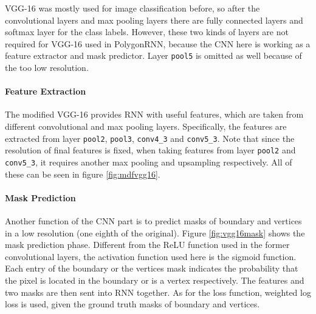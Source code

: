 

VGG-16 was mostly used for image classification before, so after the convolutional layers and max pooling layers there are fully connected layers and softmax layer for the class labels. However, these two kinds of layers are not required for VGG-16 used in PolygonRNN, because the CNN here is working as a feature extractor and mask predictor. Layer \lstinline{pool5} is omitted as well because of the too low resolution.

\paragraph{Feature Extraction} The modified VGG-16 provides RNN with useful features, which are taken from different convolutional and max pooling layers. Specifically, the features are extracted from layer \lstinline{pool2}, \lstinline{pool3}, \lstinline{conv4_3} and \lstinline{conv5_3}. Note that since the resolution of final features is fixed, when taking features from layer \lstinline{pool2} and \lstinline{conv5_3}, it requires another max pooling and upsampling respectively. All of these can be seen in figure \ref{fig:mdfvgg16}.



\paragraph{Mask Prediction}
Another function of the CNN part is to predict masks of boundary and vertices in a low resolution (one eighth of the original). Figure \ref{fig:vgg16mask} shows the mask prediction phase. Different from the ReLU function used in the former convolutional layers, the activation function used here is the sigmoid function. Each entry of the boundary or the vertices mask indicates the probability that the pixel is located in the boundary or is a vertex respectively. The features and two masks are then sent into RNN together. As for the loss function, weighted log loss is used, given the ground truth masks of boundary and vertices.


